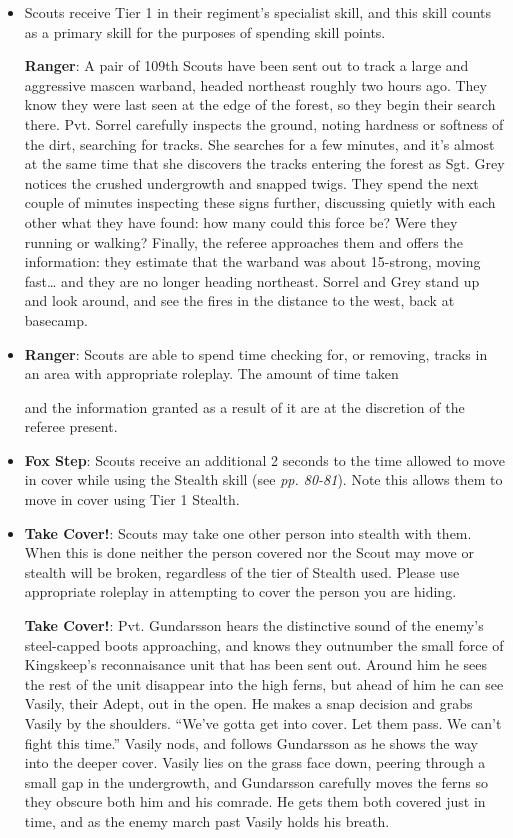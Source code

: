 \begin{itemize}
\item Scouts receive Tier 1 in their regiment's specialist skill, and this skill counts as a primary skill for the purposes of spending skill points.

\textbf{Ranger}: A pair of 109th Scouts have been sent out to track a large and aggressive mascen warband, headed northeast roughly two hours ago. They know they were last seen at the edge of the forest, so they begin their search there. Pvt. Sorrel carefully inspects the ground, noting hardness or softness of the dirt, searching for tracks. She searches for a few minutes, and it's almost at the same time that she discovers the tracks entering the forest as Sgt. Grey notices the crushed undergrowth and snapped twigs. They spend the next couple of minutes inspecting these signs further, discussing quietly with each other what they have found: how many could this force be? Were they running or walking? Finally, the referee approaches them and offers the information: they estimate that the warband was about 15-strong, moving fast{\dots} and they are no longer heading northeast. Sorrel and Grey stand up and look around, and see the fires in the distance to the west, back at basecamp.

\item \textbf{Ranger}: Scouts are able to spend time checking for, or removing, tracks in an area with appropriate roleplay. The amount of time taken

and the information granted as a result of it are at the discretion of the referee present.

\item \textbf{Fox Step}: Scouts receive an additional 2 seconds to the time allowed to move in cover while using the Stealth skill (see \textit{pp. 80-81}). Note this allows them to move in cover using Tier 1 Stealth.

\item \textbf{Take Cover!}: Scouts may take one other person into stealth with them. When this is done neither the person covered nor the Scout may move or stealth will be broken, regardless of the tier of Stealth used. Please use appropriate roleplay in attempting to cover the person you are hiding.

\textbf{Take Cover!}: Pvt. Gundarsson hears the distinctive sound of the enemy's steel-capped boots approaching, and knows they outnumber the small force of Kingskeep's reconnaisance unit that has been sent out. Around him he sees the rest of the unit disappear into the high ferns, but ahead of him he can see Vasily, their Adept, out in the open. He makes a snap decision and grabs Vasily by the shoulders. ``We've gotta get into cover. Let them pass. We can't fight this time.'' Vasily nods, and follows Gundarsson as he shows the way into the deeper cover. Vasily lies on the grass face down, peering through a small gap in the undergrowth, and Gundarsson carefully moves the ferns so they obscure both him and his comrade. He gets them both covered just in time, and as the enemy march past Vasily holds his breath.

\end{itemize}


